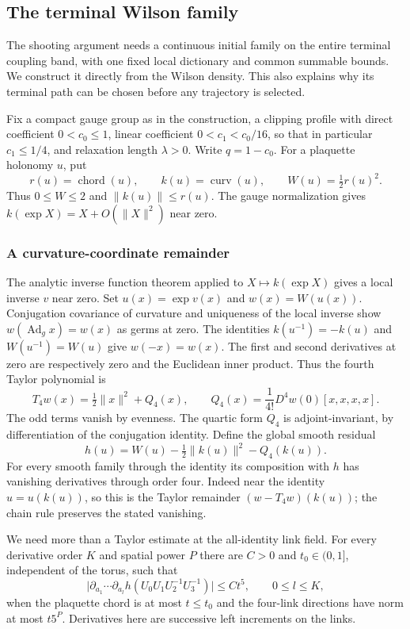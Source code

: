\subsection{The terminal Wilson family}
\label{sec:wilson-startup-construction}
The shooting argument needs a continuous initial family on the entire
terminal coupling band, with one fixed local dictionary and common
summable bounds. We construct it directly from the Wilson density.
This also explains why its terminal path can be chosen before any
trajectory is selected.

Fix a compact gauge group as in the construction, a clipping profile
with direct coefficient $0<c_0\le1$, linear coefficient
$0<c_1<c_0/16$, so that in particular $c_1\le1/4$, and relaxation
length $\lambda>0$. Write $q=1-c_0$.
For a plaquette holonomy $u$, put
\[
 r(u)=\operatorname{chord}(u),\qquad
 k(u)=\operatorname{curv}(u),\qquad
 W(u)=\tfrac12r(u)^2.
\]
Thus $0\le W\le2$ and $\|k(u)\|\le r(u)$. The gauge normalization
gives $k(\exp X)=X+O(\|X\|^2)$ near zero.

\subsubsection{A curvature-coordinate remainder}
The analytic inverse function theorem applied to $X\mapsto k(\exp X)$
gives a local inverse $v$ near zero. Set $u(x)=\exp v(x)$ and
$w(x)=W(u(x))$. Conjugation covariance of curvature and uniqueness
of the local inverse show
$w(\operatorname{Ad}_g x)=w(x)$ as germs at zero. The identities
$k(u^{-1})=-k(u)$ and $W(u^{-1})=W(u)$ give $w(-x)=w(x)$.
The first and second derivatives at zero are respectively zero and
the Euclidean inner product. Thus the fourth Taylor polynomial is
\[
 T_4w(x)=\tfrac12\|x\|^2+Q_4(x),\qquad
 Q_4(x)=\frac1{4!}D^4w(0)[x,x,x,x].
\]
The odd terms vanish by evenness. The quartic form $Q_4$ is
adjoint-invariant, by differentiation of the conjugation identity.
Define the global smooth residual
\[
 h(u)=W(u)-\tfrac12\|k(u)\|^2-Q_4(k(u)).
\]
For every smooth family through the identity its composition with $h$
has vanishing derivatives through order four. Indeed near the
identity $u=u(k(u))$, so this is the Taylor remainder
$(w-T_4w)(k(u))$; the chain rule preserves the stated vanishing.

We need more than a Taylor estimate at the all-identity link field.
For every derivative order $K$ and spatial power $P$ there are
$C>0$ and $t_0\in(0,1]$, independent of the torus, such that
\begin{equation}\label{eq:startup-residual-price}
 \bigl|\partial_{a_1}\cdots\partial_{a_l}
              h(U_0U_1U_2^{-1}U_3^{-1})\bigr|
       \le Ct^5,\qquad 0\le l\le K,
\end{equation}
when the plaquette chord is at most $t\le t_0$ and the four-link
directions have norm at most $t5^P$. Derivatives here are successive
left increments on the links.

